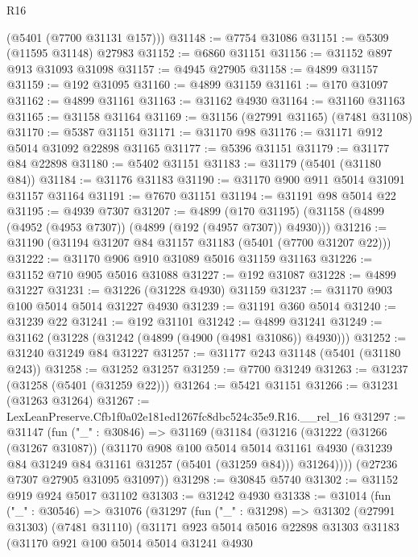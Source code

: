 \begin{lexlean}{R16}
\begin{coremodule}
      (@5401 (@7700 @31131 @157)))
@31148 := @7754 @31086
@31151 := @5309 (@11595 @31148) @27983
@31152 := @6860 @31151
@31156 := @31152 @897 @913 @31093 @31098
@31157 := @4945 @27905
@31158 := @4899 @31157
@31159 := @192 @31095
@31160 := @4899 @31159
@31161 := @170 @31097
@31162 := @4899 @31161
@31163 := @31162 @4930
@31164 := @31160 @31163
@31165 := @31158 @31164
@31169 := @31156 (@27991 @31165) (@7481 @31108)
@31170 := @5387 @31151
@31171 := @31170 @98
@31176 := @31171 @912 @5014 @31092 @22898 @31165
@31177 := @5396 @31151
@31179 := @31177 @84 @22898
@31180 := @5402 @31151
@31183 := @31179 (@5401 (@31180 @84))
@31184 := @31176 @31183
@31190 := @31170 @900 @911 @5014 @31091 @31157 @31164
@31191 := @7670 @31151
@31194 := @31191 @98 @5014 @22
@31195 := @4939 @7307
@31207 := @4899
    (@170 @31195)
    (@31158 (@4899 (@4952 (@4953 @7307)) (@4899 (@192 (@4957 @7307)) @4930)))
@31216 := @31190 (@31194 @31207 @84 @31157 @31183 (@5401 (@7700 @31207 @22)))
@31222 := @31170 @906 @910 @31089 @5016 @31159 @31163
@31226 := @31152 @710 @905 @5016 @31088
@31227 := @192 @31087
@31228 := @4899 @31227
@31231 := @31226 (@31228 @4930) @31159
@31237 := @31170 @903 @100 @5014 @5014 @31227 @4930
@31239 := @31191 @360 @5014
@31240 := @31239 @22
@31241 := @192 @31101
@31242 := @4899 @31241
@31249 := @31162 (@31228 (@31242 (@4899 (@4900 (@4981 @31086)) @4930)))
@31252 := @31240 @31249 @84 @31227
@31257 := @31177 @243 @31148 (@5401 (@31180 @243))
@31258 := @31252 @31257
@31259 := @7700 @31249
@31263 := @31237 (@31258 (@5401 (@31259 @22)))
@31264 := @5421 @31151
@31266 := @31231 (@31263 @31264)
@31267 := LexLeanPreserve.Cfb1f0a02e181ed1267fc8dbc524c35e9.R16.__rel_16
@31297 := @31147
    (fun ("_" : @30846) =>
    @31169
      (@31184
        (@31216
          (@31222
            (@31266 (@31267 @31087))
            (@31170
              @908
              @100
              @5014
              @5014
              @31161
              @4930
              (@31239 @84 @31249 @84 @31161 @31257 (@5401 (@31259 @84)))
              @31264))))
      (@27236 @7307 @27905 @31095 @31097))
@31298 := @30845 @5740
@31302 := @31152 @919 @924 @5017 @31102
@31303 := @31242 @4930
@31338 := @31014
    (fun ("_" : @30546) =>
    @31076
      (@31297
        (fun ("_" : @31298) =>
        @31302
          (@27991 @31303)
          (@7481 @31110)
          (@31171
            @923
            @5014
            @5016
            @22898
            @31303
            @31183
            (@31170
              @921
              @100
              @5014
              @5014
              @31241
              @4930

\end{coremodule}
\end{lexlean}
